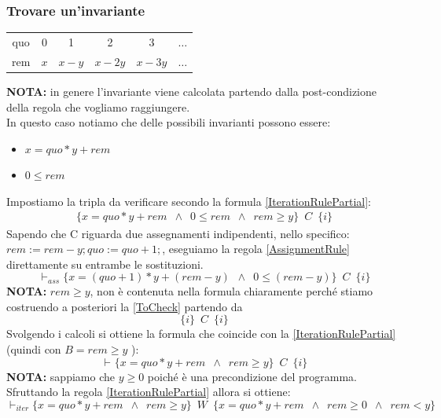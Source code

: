 \begin{esempio}
				      					\subsubsection{Trovare un'invariante}
				      					\begin{table}[H]
				      						\centering
				      						\begin{tabular}[H]{c|ccccc}
				      							quo & 0   & 1     & 2      & 3      & $\ldots$ \\
				      							rem & $x$ & $x-y$ & $x-2y$ & $x-3y$ & $\ldots$ 
				      						\end{tabular}
				      					\end{table}
				      					\textbf{NOTA:} in genere l'invariante viene calcolata partendo dalla post-condizione della regola che vogliamo raggiungere.\\
				      					In questo caso notiamo che delle possibili invarianti possono essere:
				      					\begin{itemize}
				      						\item $x=quo*y + rem$
				      						\item $0 \leq rem$
				      					\end{itemize}
				      					Impostiamo la tripla da verificare secondo la formula \ref{IterationRulePartial}:\\
				      					\begin{align}
				      						\{x=quo*y + rem\,\,\,\land\,\,\,0 \leq rem\,\,\,\land\,\,\,rem\geq y\}\,\,\,C\,\,\,\{i\} 
				      						\label{ToCheck}                                                                          
				      					\end{align}
				      					Sapendo che C riguarda due assegnamenti indipendenti, nello specifico: $        rem := rem - y; quo := quo + 1;$, eseguiamo la regola \ref{AssignmentRule} direttamente su entrambe le sostituzioni.
				      					\[\vdash_{ass}\{x=(quo+1)*y + (rem -y)\,\,\,\land\,\,\,0 \leq (rem-y)\}\,\,\,C\,\,\,\{i\}\]
				      					\textbf{NOTA:} $rem \geq y $, non è contenuta nella formula chiaramente perché stiamo costruendo a posteriori la \ref{ToCheck} partendo da \[\{i\}\,\,\,C\,\,\,\{i\}\]
				      					Svolgendo i calcoli si ottiene la formula che coincide con la \ref{IterationRulePartial} (quindi con $B = rem\geq y$ ):
				      					\[\vdash_{}\{x=quo*y + rem\,\,\,\land\,\,\,rem\geq y\}\,\,\,C\,\,\,\{i\}\]
				      					\textbf{NOTA:} sappiamo che $y\geq0$ poiché è una precondizione del programma.
				      					Sfruttando la regola \ref{IterationRulePartial} allora si ottiene:
				      					\[\vdash_{iter}\{x=quo*y + rem\,\,\,\land\,\,\,rem\geq y\}\,\,\,W\,\,\,\{x=quo*y + rem\,\,\,\land\,\,\,rem\geq 0\,\,\,\land\,\,\,rem<y\}\]

\end{esempio}
